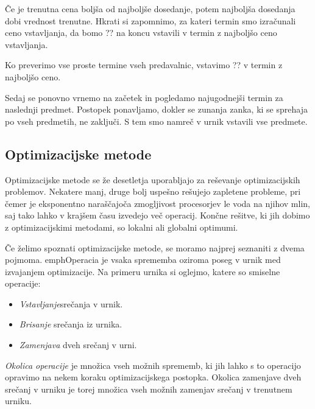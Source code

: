 \documentclass[10pt,a4paper]{article}
\begin{document}
   Če je trenutna cena boljša od najboljše dosedanje, potem najboljša dosedanja
   dobi vrednost trenutne. Hkrati si zapomnimo, za kateri termin smo izračunali ceno
   vstavljanja, da bomo ?? na koncu vstavili v termin z najboljšo
   ceno vstavljanja.

   Ko preverimo vse proste termine vseh predavalnic, vstavimo ??
   v termin z najboljšo ceno.

   Sedaj se ponovno vrnemo na začetek in pogledamo najugodnejši termin za naslednji
   predmet. Postopek ponavljamo, dokler se zunanja zanka, ki se sprehaja po vseh predmetih,
   ne zaključi. S tem smo namreč v urnik vstavili vse predmete.

\subsection{Optimizacijske metode}

Optimizacijske metode se že desetletja uporabljajo za reševanje optimizacijskih problemov.
Nekatere manj, druge bolj uspešno rešujejo zapletene probleme, pri čemer je eksponentno
naraščajoča zmogljivost procesorjev le voda na njihov mlin, saj tako lahko v krajšem
času izvedejo več operacij. Končne rešitve, ki jih dobimo z optimizacijskimi metodami,
so lokalni ali globalni optimumi.

Če želimo spoznati optimizacijske metode, se moramo najprej seznaniti z dvema pojmoma.
emph{Operacia} je vsaka sprememba oziroma poseg v urnik med izvajanjem optimizacije.
Na primeru urnika si oglejmo, katere so smiselne operacije:

\begin{itemize}
   \item \emph{Vstavljanje}srečanja v urnik.
   \item \emph{Brisanje} srečanja iz urnika.
   \item \emph{Zamenjava} dveh srečanj v urni.
\end{itemize}

\noindent
\emph{Okolica operacije} je množica vseh možnih sprememb, ki jih lahko s to operacijo
opravimo na nekem koraku optimizacijskega postopka. Okolica zamenjave dveh srečanj v urniku
je torej množica vseh možnih zamenjav srečanj v trenutnem urniku.
\end{document}
